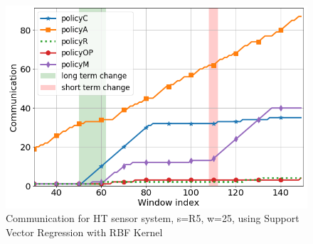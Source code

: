 \documentclass{mpaper}
\begin{document}
\begin{figure}
    \centering
    \includegraphics[scale=0.34]{imgs/comm_svr_rbf_R5.png}
    \caption{Communication for HT sensor system, s=R5, w=25, using Support Vector Regression with RBF Kernel}
    \label{fig:comm_rbf_svr_R5}
\end{figure}
\end{document}
